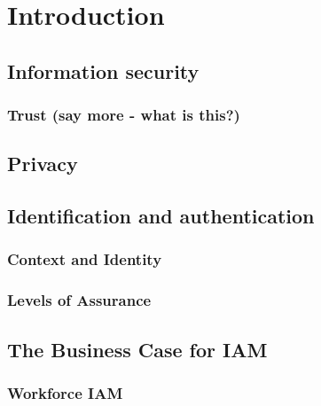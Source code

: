 \hypertarget{introduction}{%
\chapter{Introduction}\label{introduction}}

\hypertarget{information-security}{%
\section{Information security}\label{information-security}}

\hypertarget{trust-say-more---what-is-this}{%
\subsection{Trust (say more - what is
this?)}\label{trust-say-more---what-is-this}}

\hypertarget{privacy}{%
\section{Privacy}\label{privacy}}

\hypertarget{identification-and-authentication}{%
\section{Identification and
authentication}\label{identification-and-authentication}}

\hypertarget{context-and-identity}{%
\subsection{Context and Identity}\label{context-and-identity}}

\hypertarget{levels-of-assurance}{%
\subsection{Levels of Assurance}\label{levels-of-assurance}}

\hypertarget{the-business-case-for-iam}{%
\section{The Business Case for IAM}\label{the-business-case-for-iam}}

\hypertarget{workforce-iam}{%
\subsection{Workforce IAM}\label{workforce-iam}}

